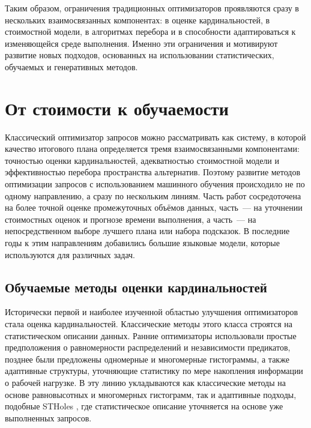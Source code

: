 Таким образом, ограничения традиционных оптимизаторов проявляются сразу в нескольких взаимосвязанных компонентах: в оценке кардинальностей, в стоимостной модели, в алгоритмах перебора и в способности адаптироваться к изменяющейся среде выполнения. Именно эти ограничения и мотивируют развитие новых подходов, основанных на использовании статистических, обучаемых и генеративных методов\cite{2020arXiv200909884H, sel_est, 10.1145/3318464.3389741, 10.14778/3352063.3352129, 10.1145/3035918.3064029, 10.1145/3299869.3300085, marcus2019neo, ortiz2019localce, woltmann2023fastgres, anneser2023autosteer, coool2023, zhu2023lero, hero2024, ivanov2017aqo, 10.1145/3514221.3517885, 10.1145/3448016.3452838}.

\section{От стоимости к обучаемости}\label{sec:ch1/sec2}

Классический оптимизатор запросов можно рассматривать как систему, в которой качество итогового плана определяется тремя взаимосвязанными компонентами: точностью оценки кардинальностей, адекватностью стоимостной модели и эффективностью перебора пространства альтернатив. Поэтому развитие методов оптимизации запросов с использованием машинного обучения происходило не по одному направлению, а сразу по нескольким линиям. Часть работ сосредоточена на более точной оценке промежуточных объёмов данных, часть~--- на уточнении стоимостных оценок и прогнозе времени выполнения, а часть~--- на непосредственном выборе лучшего плана или набора подсказок. В последние годы к этим направлениям добавились большие языковые модели, которые используются для различных задач.

\subsection{Обучаемые методы оценки кардинальностей}

Исторически первой и наиболее изученной областью улучшения оптимизаторов стала оценка кардинальностей. Классические методы этого класса строятся на статистическом описании данных. Ранние оптимизаторы использовали простые предположения о равномерности распределений и независимости предикатов, позднее были предложены одномерные и многомерные гистограммы, а также адаптивные структуры, уточняющие статистику по мере накопления информации о рабочей нагрузке. В эту линию укладываются как классические методы на основе равновысотных и многомерных гистограмм, так и адаптивные подходы, подобные STHoles \cite{10.1145/376284.375686}, где статистическое описание уточняется на основе уже выполненных запросов.

